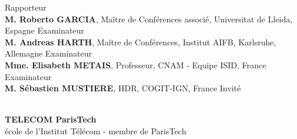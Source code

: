 \begin{titlepage}
\begin{minipage}{.9\textwidth}
	\hfill Rapporteur\\
{\bf M. Roberto GARCIA}, {\small Maître de Conférences associé, Universitat de Lleida, Espagne }
	\hfill Examinateur\\
{\bf M. Andreas HARTH}, {\small Maître de Conférences, Institut AIFB, Karlsruhe, Allemagne}
	\hfill Examinateur\\
{\bf Mme. Elisabeth METAIS}, {\small Professeur, CNAM - Equipe ISID, France}
	\hfill Examinateur\\
{\bf M. Sébastien MUSTIERE}, {\small HDR, COGIT-IGN, France}
	\hfill Invité\\

\end{minipage}\\
%
%
%
%
%
%
\centering
{\bf TELECOM ParisTech}\\
{\small école de l'Institut Télécom - membre de ParisTech}
%
%
%
\end{titlepage}
